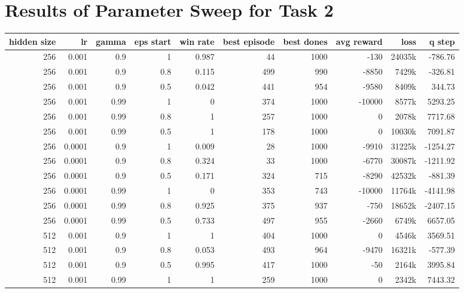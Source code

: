 \renewcommand{\topfraction}{1}
\renewcommand{\bottomfraction}{1}
\renewcommand{\textfraction}{0}
\renewcommand{\floatpagefraction}{1}

\renewcommand{\thesection}{Appendix B}
\section{Results of Parameter Sweep for Task 2}
\label{param_sweep_result_appendix}
\begin{table}
	\centering
	\scriptsize
	\begin{tabular}{r r r r | r r r r r r}
		\toprule
			hidden size & lr & gamma & eps start & win rate & best episode & best dones & avg reward & loss & q step \\
		\midrule
			256 & 0.001 & 0.9 & 1 & 0.987 & 44 & 1000 & -130 & 24035k & -786.76 \\
			256 & 0.001 & 0.9 & 0.8 & 0.115 & 499 & 990 & -8850 & 7429k & -326.81 \\
			256 & 0.001 & 0.9 & 0.5 & 0.042 & 441 & 954 & -9580 & 8409k & 344.73 \\
			256 & 0.001 & 0.99 & 1 & 0 & 374 & 1000 & -10000 & 8577k & 5293.25 \\
			256 & 0.001 & 0.99 & 0.8 & 1 & 257 & 1000 & 0 & 2078k & 7717.68 \\
			256 & 0.001 & 0.99 & 0.5 & 1 & 178 & 1000 & 0 & 10030k & 7091.87 \\
			256 & 0.0001 & 0.9 & 1 & 0.009 & 28 & 1000 & -9910 & 31225k & -1254.27 \\
			256 & 0.0001 & 0.9 & 0.8 & 0.324 & 33 & 1000 & -6770 & 30087k & -1211.92 \\
			256 & 0.0001 & 0.9 & 0.5 & 0.171 & 324 & 715 & -8290 & 42532k & -881.39 \\
			256 & 0.0001 & 0.99 & 1 & 0 & 353 & 743 & -10000 & 11764k & -4141.98 \\
			256 & 0.0001 & 0.99 & 0.8 & 0.925 & 375 & 937 & -750 & 18652k & -2407.15 \\
			256 & 0.0001 & 0.99 & 0.5 & 0.733 & 497 & 955 & -2660 & 6749k & 6657.05 \\
			512 & 0.001 & 0.9 & 1 & 1 & 404 & 1000 & 0 & 4546k & 3569.51 \\
			512 & 0.001 & 0.9 & 0.8 & 0.053 & 493 & 964 & -9470 & 16321k & -577.39 \\
			512 & 0.001 & 0.9 & 0.5 & 0.995 & 417 & 1000 & -50 & 2164k & 3995.84 \\
			512 & 0.001 & 0.99 & 1 & 1 & 259 & 1000 & 0 & 2342k & 7443.32 \\

\end{tabular}
\end{table}
